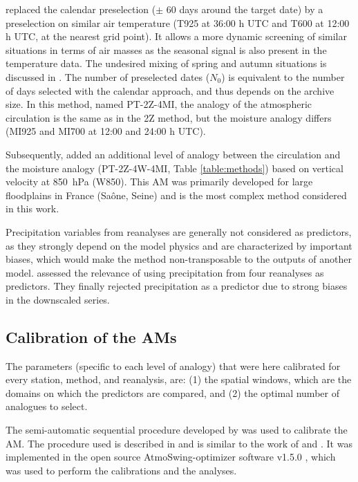 \documentclass{ametsoc}
\begin{document}
\citet{BenDaoud2016} replaced the calendar preselection ($\pm$ 60 days around the target date) by a preselection on similar air temperature (T925 at 36:00 h UTC and T600 at 12:00 h UTC, at the nearest grid point). It allows a more dynamic screening of similar situations in terms of air masses as the seasonal signal is also present in the temperature data. The undesired mixing of spring and autumn situations is discussed in \citet{Caillouet2016}. The number of preselected dates ($N_{0}$) is equivalent to the number of days selected with the calendar approach, and thus depends on the archive size. In this method, named PT-2Z-4MI, the analogy of the atmospheric circulation is the same as in the 2Z method, but the moisture analogy differs (MI925 and MI700 at 12:00 and 24:00 h UTC).

Subsequently, \citet{BenDaoud2016} added an additional level of analogy between the circulation and the moisture analogy (PT-2Z-4W-4MI, Table \ref{table:methods}) based on vertical velocity at 850~hPa (W850). This AM was primarily developed for large floodplains in France (Sa\^{o}ne, Seine) and is the most complex method considered in this work. 

Precipitation variables from reanalyses are generally not considered as predictors, as they strongly depend on the model physics \citep{Rienecker2011} and are characterized by important biases, which would make the method non-transposable to the outputs of another model. \citet{Dayon2015} assessed the relevance of using precipitation from four reanalyses as predictors. They finally rejected precipitation as a predictor due to strong biases in the downscaled series.


\subsection{Calibration of the AMs}
\label{sec:calibration}

The parameters (specific to each level of analogy) that were here calibrated for every station, method, and reanalysis, are: (1) the spatial windows, which are the domains on which the predictors are compared, and (2) the optimal number of analogues to select.

The semi-automatic sequential procedure developed by \citet{Bontron2004} was used to calibrate the AM. The procedure used is described in \citet{Horton2017c} and is similar to the work of \citet{Radanovics2013} and \citet{BenDaoud2016}. It was implemented in the open source AtmoSwing-optimizer software v1.5.0 \citep[www.atmoswing.org,][]{Horton2017a}, which was used to perform the calibrations and the analyses.
\end{document}
